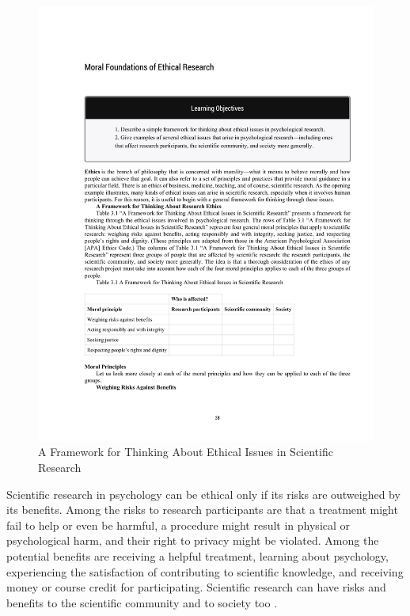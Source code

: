  \begin{figure}
       \includegraphics[width=\linewidth]{figures/C3ethicsTable.pdf}
       \caption{A Framework for Thinking About Ethical Issues in Scientific Research}
       \label{fig:EthicsTable}
 \end{figure}


Scientific research in psychology can be ethical only if its risks are outweighed by its benefits. Among the risks to research participants are that a treatment might fail to help or even be harmful, a procedure might result in physical or psychological harm, and their right to privacy might be violated. Among the potential benefits are receiving a helpful treatment, learning about psychology, experiencing the satisfaction of contributing to scientific knowledge, and receiving money or course credit for participating. Scientific research can have risks and benefits to the scientific community and to society too \citep{rosenthal_science_1994}.


